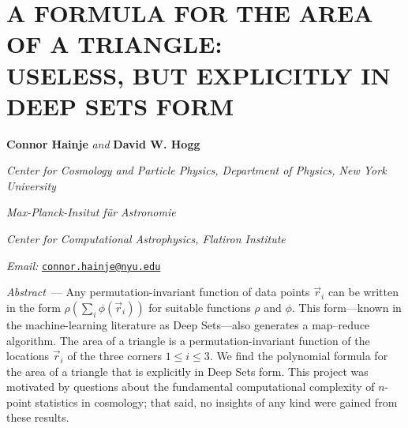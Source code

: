 \documentclass[10pt]{article}
\renewcommand{\paragraph}[1]{\par\addvspace{1em}\noindent\textsl{#1}~---}
\newcommand{\aOne}{\textsuperscript{\textasteriskcentered}}
\newcommand{\aTwo}{\textsuperscript{\textdagger}}
\newcommand{\aThree}{\textsuperscript{\textdaggerdbl}}
\newcommand{\aFour}{\textsuperscript{\textsection}}
\newcommand{\aFive}{\textsuperscript{\textbardbl}}
\newcommand{\aSix}{\textsuperscript{\textparagraph}}
\begin{document}
\thispagestyle{empty}\setcounter{secnumdepth}{0}

\section*{\centering\normalsize\uppercase{
A formula for the area of a triangle:\\
Useless, but explicitly in Deep Sets form}}

\medskip
\noindent
\textbf{Connor Hainje}\aOne\aSix{}
\textsl{and}
\textbf{David W. Hogg}\aOne\aTwo\aThree%

\medskip
{\footnotesize\par\noindent \aOne\textsl{
Center for Cosmology and Particle Physics, Department of Physics, New York University}}
{\footnotesize\par\noindent \aTwo\textsl{
Max-Planck-Insitut f\"ur Astronomie}}
{\footnotesize\par\noindent \aThree\textsl{
Center for Computational Astrophysics, Flatiron Institute}}
{\footnotesize\par\noindent \aSix\textsl{
Email:} \texttt{\href{mailto:connor.hainje@nyu.edu}{connor.hainje@nyu.edu}}}
{\footnotesize\par}  %

\smallskip
\paragraph{Abstract}
Any permutation-invariant function of data points $\vec{r}_i$
can be written in the form $\rho(\sum_i\phi(\vec{r}_i))$ for suitable functions $\rho$ and $\phi$.
This form---known in the machine-learning literature as Deep Sets---also generates a map--reduce algorithm.
The area of a triangle is a permutation-invariant function of the locations $\vec{r}_i$ of the three corners $1\leq i\leq 3$.
We find the polynomial formula for the area of a triangle that is explicitly in Deep Sets form.
This project was motivated by questions about the fundamental computational complexity of $n$-point statistics in cosmology;
that said, no insights of any kind were gained from these results.
\end{document}
